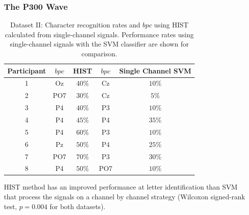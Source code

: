 \documentclass[aspectratio=169]{beamer}
\begin{document}
\begin{frame}
\frametitle{The P300 Wave}
\begin{center}
\begin{table}[h!]
\caption[Dataset II - Single Channel Character Recognition Rates]{Dataset II: Character recognition rates and $bpc$  using HIST calculated from  single-channel signals.  Performance rates using single-channel signals with the SVM classifier are shown for comparison.}
\centering
\begin{tabular}{c|cc|cc}
\toprule
\textbf{Participant}	&  $bpc$	&  HIST &  $bpc$	&  Single Channel SVM \\
\midrule
1     &     Oz   &   $40\%$  &  Cz   &  $10\%$    \\
2     &     PO7   &   $30\%$      &  Cz   & $5\%$   \\
3     &     P4   &   $40\%$    &  P3   & $10\%$    \\
4     &     P4 &   $45\%$    &  P4   & $35\%$     \\
5     &     P4 &   $60\%$  &  P3   & $10\%$     \\
6     &     Pz &   $50\%$ &  P4   & $25\%$     \\
7     &     PO7 &   $70\%$  &  P3   & $30\%$     \\
8     &     P4 &   $50\%$    &  PO7   & $10\%$    \\

\end{tabular}
\label{tab:resultsown}
\end{table}
HIST method has an improved performance at letter identification than SVM that process the signals on a channel by channel strategy (Wilcoxon signed-rank test, $p =  0.004$ for both datasets).
\end{center}
\end{frame} 
\end{document}
